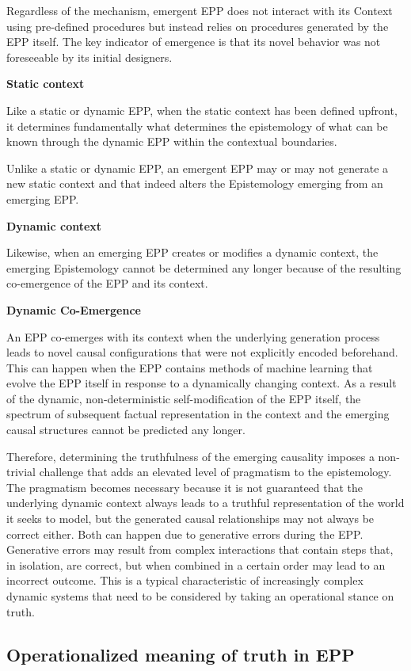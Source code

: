 \documentclass{article}
\begin{document}
Regardless of the mechanism, emergent EPP does not interact with its Context using pre-defined procedures but instead relies on procedures generated by the EPP itself. The key indicator of emergence is that its novel behavior was not foreseeable by its initial designers.

\textbf{Static context}

Like a static or dynamic EPP, when the static context has been defined upfront, it determines fundamentally what determines the epistemology of what can be known through the dynamic EPP within the contextual boundaries.

Unlike a static or dynamic EPP, an emergent EPP may or may not generate a new static context and that indeed alters the Epistemology emerging from an emerging EPP.

\textbf{Dynamic context}

Likewise, when an emerging EPP creates or modifies a dynamic context, the emerging Epistemology cannot be determined any longer because of the resulting co-emergence of the EPP and its context.

\textbf{Dynamic Co-Emergence}

An EPP co-emerges with its context when the underlying generation process leads to novel causal configurations that were not explicitly encoded beforehand. This can happen when the EPP contains methods of machine learning that evolve the EPP itself in response to a dynamically changing context. As a result of the dynamic, non-deterministic self-modification of the EPP itself, the spectrum of subsequent factual representation in the context and the emerging causal structures cannot be predicted any longer.

Therefore, determining the truthfulness of the emerging causality imposes a non-trivial challenge that adds an elevated level of pragmatism to the epistemology. The pragmatism becomes necessary because it is not guaranteed that the underlying dynamic context always leads to a truthful representation of the world it seeks to model, but the generated causal relationships may not always be correct either. Both can happen due to generative errors during the EPP. Generative errors may result from complex interactions that contain steps that, in isolation, are correct, but when combined in a certain order may lead to an incorrect outcome. This is a typical characteristic of increasingly complex dynamic systems that need to be considered by taking an operational stance on truth.

\subsection{Operationalized meaning of truth in EPP}
\end{document}
